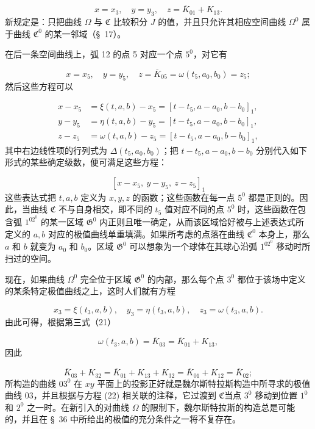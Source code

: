 \documentclass[11pt,a4paper,leqno]{article}
\begin{document}
\begin{equation}\tag{21}
x=x_3,\quad y=y_3,\quad z=\overline{K}_{01}+K_{13}.
\end{equation}
新规定是：只把曲线 $\Omega$ 与 $\mathfrak{C}$ 比较积分 $J$ 的值，并且只允许其相应空间曲线 $\Omega^0$ 属于曲线 $\mathfrak{C}^0$ 的某一邻域（\S~17）。

在后一条空间曲线上，弧 12 的点 5 对应一个点 $5^0$，对它有

\[
x=x_5,\quad y=y_5,\quad z=\overline{K}_{05}=\omega(t_5,a_0,b_0)=z_5;
\]
然后这些方程可以

\begin{equation}\tag{22}
\begin{aligned}
x-x_5&=\xi(t,a,b)-x_5=[t-t_5,a-a_0,b-b_0]_1,\\
y-y_5&=\eta(t,a,b)-y_5=[t-t_5,a-a_0,b-b_0]_1,\\
z-z_5&=\omega(t,a,b)-z_5=[t-t_5,a-a_0,b-b_0]_1,
\end{aligned}
\end{equation}
其中右边线性项的行列式为 $\Delta(t_5,a_0,b_0)$；把 $t-t_5,a-a_0,b-b_0$ 分别代入如下形式的某些确定级数，便可满足这些方程：

\[
[x-x_5,\ y-y_5,\ z-z_5]_1
\]
这些表达式把 $t,a,b$ 定义为 $x,y,z$ 的函数；这些函数在每一点 $5^0$ 都是正则的。因此，当曲线 $\mathfrak{C}$ 不与自身相交，即不同的 $t_5$ 值对应不同的点 $5^0$ 时，这些函数在包含弧 $1^02^0$ 的某一区域 $\mathfrak{G}^0$ 内正则且唯一确定，从而该区域恰好被与上述表达式所定义的 $a,b$ 对应的极值曲线单重填满。如果所考虑的点落在曲线 $\mathfrak{C}^0$ 本身上，那么 $a$ 和 $b$ 就变为 $a_0$ 和 $b_0$。区域 $\mathfrak{G}^0$ 可以想象为一个球体在其球心沿弧 $1^02^0$ 移动时所扫过的空间。

现在，如果曲线 $\Omega^0$ 完全位于区域 $\mathfrak{G}^0$ 的内部，那么每个点 $3^0$ 都位于该场中定义的某条特定极值曲线之上，这时人们就有方程

\[
x_3=\xi(t_3,a,b),\quad y_3=\eta(t_3,a,b),\quad z_3=\omega(t_3,a,b).
\]
由此可得，根据第三式（21）

\[
\omega(t_3,a,b)=\overline{K}_{03}=\overline{K}_{01}+K_{13},
\]
因此

\[
\overline{K}_{03}+K_{32}=\overline{K}_{01}+K_{13}+K_{32}=\overline{K}_{01}+K_{12}=\overline{K}_{02};
\]
所构造的曲线 $03^0$ 在 $xy$ 平面上的投影正好就是魏尔斯特拉斯构造中所寻求的极值曲线 03，并且根据与方程 (22) 相关联的注释，它过渡到 $\mathfrak{C}$当点 $3^0$ 移动到位置 $1^0$ 和 $2^0$ 之一时。在新引入的对曲线 $\Omega$ 的限制下，魏尔斯特拉斯的构造总是可能的，并且在 \S~36 中所给出的极值的充分条件之一将不复存在。
\end{document}
